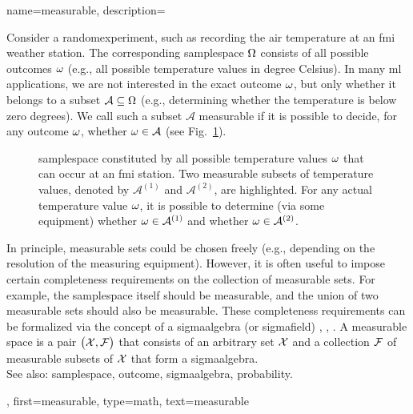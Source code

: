 {name={measurable}, 
	description={Consider a \gls{randomexperiment}, such as recording 
		the air temperature at an \gls{fmi} weather station. The corresponding \gls{samplespace} 
		$\Omega$ consists of all possible \glspl{outcome} $\omega$ (e.g., 
		all possible temperature values in degree Celsius). In many \gls{ml} 
		applications, we are not interested in the exact \gls{outcome} $\omega$, but only 
		whether it belongs to a subset $\mathcal{A} \subseteq \Omega$ 
		(e.g., determining whether the temperature is below zero degrees). 
		We call such a subset $\mathcal{A}$ measurable if it is possible to 
		decide, for any \gls{outcome} $\omega$, whether $\omega \in \mathcal{A}$ 
		(see Fig.\ \ref{fig_measurable_dict}).
		\begin{figure}[H]
		\begin{center}
			\vspace*{10mm}
			\end{center}
		\caption{\Gls{samplespace} constituted by all possible temperature values $\omega$ 
			that can occur at an \gls{fmi} station. Two measurable subsets of temperature 
			values, denoted by $\mathcal{A}^{(1)}$ and $\mathcal{A}^{(2)}$, are highlighted. For any 
			actual temperature value $\omega$, it is possible to determine (via some equipment) 
			whether $\omega \in \mathcal{A}^{(1)}$ and whether $\omega \in \mathcal{A}^{(2)}$. 
			\label{fig_measurable_dict}} 
		\end{figure}
		In principle, measurable sets could be chosen freely (e.g., depending on the resolution of the 
		measuring equipment). However, it is often useful to impose certain completeness requirements 
		on the collection of measurable sets. For example, the \gls{samplespace} itself should be 
		measurable, and the union of two measurable sets should also be measurable. These completeness 
		requirements can be formalized via the concept of a \gls{sigmaalgebra} (or \gls{sigmafield}) 
		\cite{RudinBook}, \cite{BillingsleyProbMeasure}, \cite{durrett2010probability}. 
		A measurable space is a pair $\big(\mathcal{X},\mathcal{F}\big)$ that consists of an arbitrary 
		set $\mathcal{X}$ and a collection $\mathcal{F}$ of measurable subsets of $\mathcal{X}$ 
		that form a \gls{sigmaalgebra}. 
		\\
		See also: \gls{samplespace}, \gls{outcome}, \gls{sigmaalgebra}, \gls{probability}.},
	first={measurable},
	type=math, 
	text={measurable} 
}

